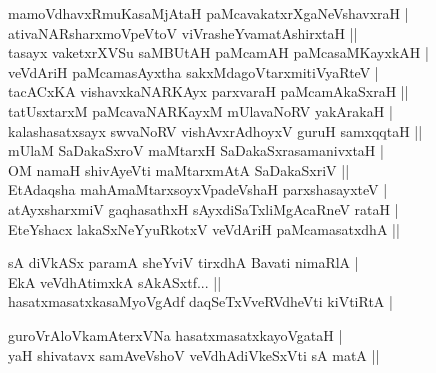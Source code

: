 \begin{entry}
\smallskip
\begin{shl}
mamoVdhavxRmuKasaMjAtaH paMcavakatxrXgaNeVshavxraH |\\
ativaNARsharxmoVpeVtoV viVrasheYvamatAshirxtaH ||\\
tasayx vaketxrXVSu saMBUtAH paMcamAH paMcasaMKayxkAH |\\
veVdAriH paMcamasAyxtha sakxMdagoVtarxmitiVyaRteV |\\
tacACxKA vishavxkaNARKAyx parxvaraH paMcamAkaSxraH ||\\
tatUsxtarxM paMcavaNARKayxM mUlavaNoRV yakArakaH |\\
kalashasatxsayx swvaNoRV vishAvxrAdhoyxV guruH samxqqtaH ||\\
mUlaM SaDakaSxroV maMtarxH SaDakaSxrasamanivxtaH |\\
OM namaH shivAyeVti maMtarxmAtA SaDakaSxriV ||\\
EtAdaqsha mahAmaMtarxsoyxVpadeVshaH parxshasayxteV |\\
atAyxsharxmiV gaqhasathxH sAyxdiSaTxliMgAcaRneV rataH |\\
EteYshacx lakaSxNeYyuRkotxV veVdAriH paMcamasatxdhA ||
\end{shl}
\smallskip
{}
\smallskip
{}
\end{entry}

\begin{entry}
\smallskip
\begin{shl}
sA diVkASx paramA sheYviV tirxdhA Bavati nimaRlA |\\
EkA veVdhAtimxkA sAkASxtf... ||\\
hasatxmasatxkasaMyoVgAdf daqSeTxVveRVdheVti kiVtiRtA |
\end{shl}
\smallskip
{}
\smallskip
\begin{shl}
guroVrAloVkamAterxVNa hasatxmasatxkayoVgataH |\\
yaH shivatavx samAveVshoV veVdhAdiVkeSxVti sA matA ||
\end{shl}
\smallskip
{}
\smallskip
{}
\end{entry}


